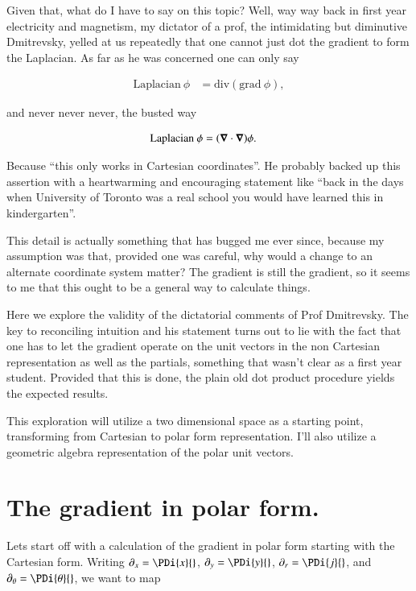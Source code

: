 Given that, what do I have to say on this topic?  Well, way way back in first year electricity and magnetism, my dictator of a prof, the intimidating but diminutive Dmitrevsky, yelled at us repeatedly that one cannot just dot the gradient to form the Laplacian.  As far as he was concerned one can only say

\begin{align}\label{eqn:divGradCurLap:2}
\text{Laplacian}\  \phi &= \text{div} (\text{grad}\ \phi),
\end{align}

and never never never, the busted way

\begin{align}\label{eqn:divGradCurLap:3}
\text{Laplacian}\  \phi &= (\boldsymbol{\nabla} \cdot \boldsymbol{\nabla}) \phi.
\end{align}

Because ``this only works in Cartesian coordinates''.  He probably backed up this assertion with a heartwarming and encouraging statement like ``back in the days when University of Toronto was a real school you would have learned this in kindergarten''.

This detail is actually something that has bugged me ever since, because my assumption was that, provided one was careful, why would a change to an alternate coordinate system matter?  The gradient is still the gradient, so it seems to me that this ought to be a general way to calculate things.

Here we explore the validity of the dictatorial comments of Prof Dmitrevsky.  The key to reconciling intuition and his statement turns out to lie with the fact that one has to let the gradient operate on the unit vectors in the non Cartesian representation as well as the partials, something that wasn't clear as a first year student.  Provided that this is done, the plain old dot product procedure yields the expected results.

This exploration will utilize a two dimensional space as a starting point, transforming from Cartesian to polar form representation.  I'll also utilize a geometric algebra representation of the polar unit vectors.

\section{The gradient in polar form.}

Lets start off with a calculation of the gradient in polar form starting with the Cartesian form.  Writing $\partial_x = \PDi{x}{}$, $\partial_y = \PDi{y}{}$, $\partial_r = \PDi{j}{}$, and $\partial_\theta = \PDi{\theta}{}$, we want to map

